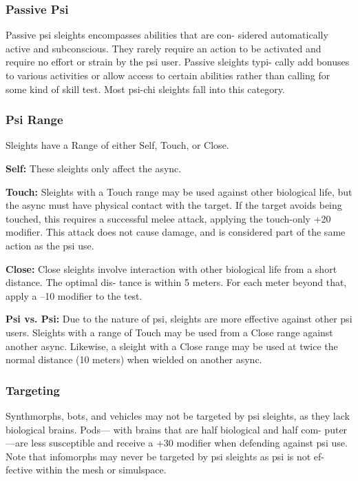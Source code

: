 \subsubsection{Passive Psi}

Passive psi sleights encompasses abilities that are con-
sidered automatically active and subconscious. They 
rarely require an action to be activated and require 
no effort or strain by the psi user. Passive sleights typi-
cally add bonuses to various activities or allow access 
to certain abilities rather than calling for some kind of 
skill test. Most psi-chi sleights fall into this category.

\subsubsection{Psi Range}

Sleights have a Range of either Self, Touch, or Close.

\textbf{Self:} These sleights only affect the async.

\textbf{Touch:} Sleights with a Touch range may be used 
against other biological life, but the async must have 
physical contact with the target. If the target avoids 
being touched, this requires a successful melee attack, 
applying the touch-only +20 modifier.  This  attack 
does not cause damage, and is considered part of the 
same action as the psi use.

\textbf{Close:} Close sleights involve interaction with other 
biological life from a short distance. The optimal dis-
tance is within 5 meters. For each meter beyond that, 
apply a –10 modifier to the test.

\textbf{Psi vs. Psi:} Due to the nature of psi, sleights are 
more effective against other psi users. Sleights with 
a range of Touch may be used from a Close range 
against another async. Likewise, a sleight with a Close 
range may be used at twice the normal distance (10 
meters) when wielded on another async.

\subsubsection{Targeting}

Synthmorphs, bots, and vehicles may not be targeted 
by psi sleights, as they lack biological brains. Pods—
with brains that are half biological and half com-
puter—are less susceptible and receive a +30 modifier 
when defending against psi use. Note that infomorphs 
may never be targeted by psi sleights as psi is not ef-
fective within the mesh or simulspace.

